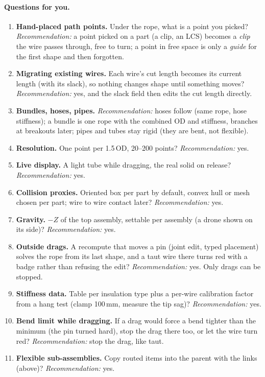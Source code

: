 \paragraph{Questions for you.}
\begin{enumerate}[label=W\arabic*.]
  \item \textbf{Hand-placed path points.} Under the rope, what is a point you picked? \emph{Recommendation:} a
        point picked on a part (a clip, an LCS) becomes a \emph{clip} the wire passes through, free to turn; a point
        in free space is only a \emph{guide} for the first shape and then forgotten.
  \item \textbf{Migrating existing wires.} Each wire's cut length becomes its current length (with its slack), so
        nothing changes shape until something moves? \emph{Recommendation:} yes, and the slack field then edits the
        cut length directly.
  \item \textbf{Bundles, hoses, pipes.} \emph{Recommendation:} hoses follow (same rope, hose stiffness); a bundle is
        one rope with the combined OD and stiffness, branches at breakouts later; pipes and tubes stay rigid (they are
        bent, not flexible).
  \item \textbf{Resolution.} One point per 1.5\,OD, 20--200 points? \emph{Recommendation:} yes.
  \item \textbf{Live display.} A light tube while dragging, the real solid on release? \emph{Recommendation:} yes.
  \item \textbf{Collision proxies.} Oriented box per part by default, convex hull or mesh chosen per part; wire to
        wire contact later? \emph{Recommendation:} yes.
  \item \textbf{Gravity.} $-Z$ of the top assembly, settable per assembly (a drone shown on its side)?
        \emph{Recommendation:} yes.
  \item \textbf{Outside drags.} A recompute that moves a pin (joint edit, typed placement) solves the rope from its
        last shape, and a taut wire there turns red with a badge rather than refusing the edit?
        \emph{Recommendation:} yes. Only drags can be stopped.
  \item \textbf{Stiffness data.} Table per insulation type plus a per-wire calibration factor from a hang test (clamp
        100\,mm, measure the tip sag)? \emph{Recommendation:} yes.
  \item \textbf{Bend limit while dragging.} If a drag would force a bend tighter than the minimum (the pin turned hard),
        stop the drag there too, or let the wire turn red? \emph{Recommendation:} stop the drag, like taut.
  \item \textbf{Flexible sub-assemblies.} Copy routed items into the parent with the links (above)?
        \emph{Recommendation:} yes.
\end{enumerate}

